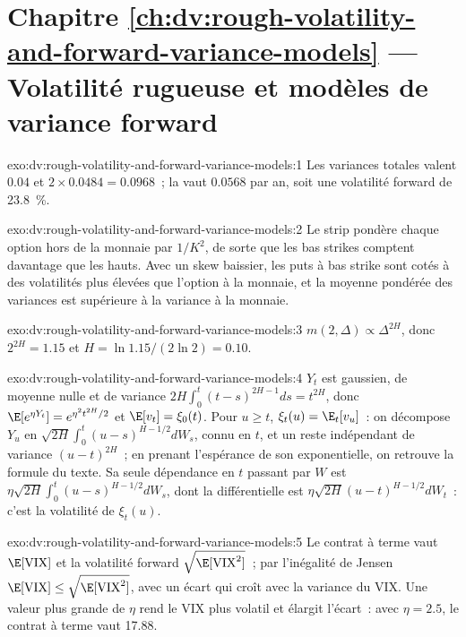 \section*{Chapitre \ref{ch:dv:rough-volatility-and-forward-variance-models} --- Volatilité rugueuse et modèles de variance forward}

\begin{solution}{exo:dv:rough-volatility-and-forward-variance-models:1}
Les variances totales valent $0.04$ et $2\times0.0484=0.0968$~; la  vaut $0.0568$ par an, soit une volatilité forward
de 23.8~\%.
\end{solution}

\begin{solution}{exo:dv:rough-volatility-and-forward-variance-models:2}
Le strip pondère chaque option hors de la monnaie par $1/K^2$, de sorte que les bas strikes comptent davantage que les hauts. Avec un
skew baissier, les puts à bas strike sont cotés à des volatilités plus élevées que l'option à la monnaie, et la
moyenne pondérée des variances est supérieure à la variance à la monnaie.
\end{solution}

\begin{solution}{exo:dv:rough-volatility-and-forward-variance-models:3}
$m(2,\Delta)\propto\Delta^{2H}$, donc $2^{2H}=1.15$ et $H=\ln1.15/(2\ln2)=0.10$.
\end{solution}

\begin{solution}{exo:dv:rough-volatility-and-forward-variance-models:4}
$Y_t$ est gaussien, de moyenne nulle et de variance $2H\int_0^t(t-s)^{2H-1}ds=t^{2H}$, donc
$\E[e^{\eta Y_t}]=e^{\eta^2t^{2H}/2}$ et $\E[v_t]=\xi_0(t)$. Pour $u\ge t$,
$\xi_t(u)=\E_t[v_u]$~: on décompose $Y_u$ en $\sqrt{2H}\int_0^t(u-s)^{H-1/2}dW_s$, connu en $t$, et un
reste indépendant de variance $(u-t)^{2H}$~; en prenant l'espérance de son exponentielle, on retrouve la formule du
texte. Sa seule dépendance en $t$ passant par $W$ est $\eta\sqrt{2H}\int_0^t(u-s)^{H-1/2}dW_s$, dont la différentielle est
$\eta\sqrt{2H}(u-t)^{H-1/2}dW_t$~: c'est la volatilité de $\xi_t(u)$.
\end{solution}

\begin{solution}{exo:dv:rough-volatility-and-forward-variance-models:5}
Le contrat à terme vaut $\E[\mathrm{VIX}]$ et la volatilité forward $\sqrt{\E[\mathrm{VIX}^2]}$~; par l'inégalité de Jensen
$\E[\mathrm{VIX}]\le\sqrt{\E[\mathrm{VIX}^2]}$, avec un écart qui croît avec la variance du VIX. Une valeur
plus grande de $\eta$ rend le VIX plus volatil et élargit l'écart~: avec $\eta=2.5$, le contrat à terme vaut 17.88.
\end{solution}

